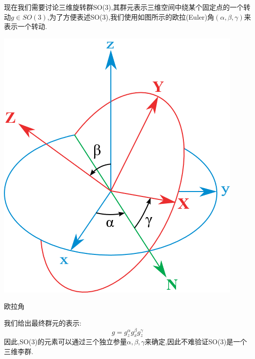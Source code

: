 \begin{example}
    现在我们需要讨论三维旋转群SO(3),其群元表示三维空间中绕某个固定点的一个转动$g\in SO(3)$,为了方便表述SO(3),我们使用如图所示的欧拉(Euler)角$(\alpha,\beta,\gamma)$来表示一个转动.
    \begin{marginfigure}
        \centering
        \includegraphics[width=0.4\linewidth]{"images/Euler angle"}
        \caption{欧拉角}
        \label{fig:euler-angle}
    \end{marginfigure}

    我们给出最终群元的表示:
    \begin{equation}
        g=g_z^\alpha g_x^\beta g_z^\gamma
    \end{equation}
    因此,SO(3)的元素可以通过三个独立参量$\alpha,\beta,\gamma$来确定,因此不难验证SO(3)是一个三维李群.
    

\end{example}
